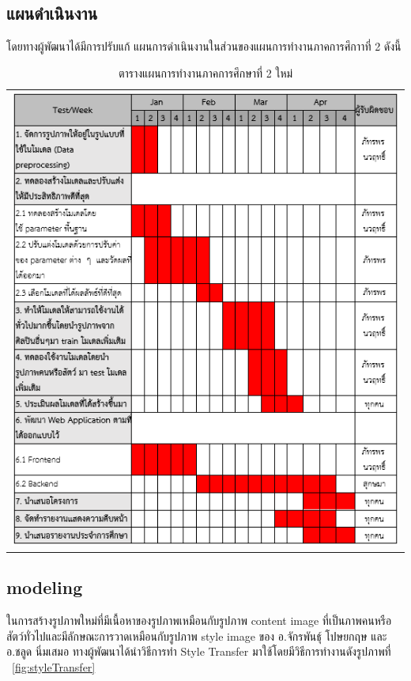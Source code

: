 \documentclass[12pt,oneside,openright,a4paper]{cpe-thai-project}
\begin{document}
\subsection{แผนดำเนินงาน}
โดยทางผู้พัฒนาได้มีการปรับแก้ แผนการดำเนินงานในส่วนของแผนการทำงานภาคการศึกาาที่ 2 ดังนี้

\begin{table}[!h]
  \centering
  \begin{tabular}{c}
  \hfill
  \includegraphics[width=15cm]{./image/newplan.png}
  \hfill
  \end{tabular}
\caption{ตารางแผนการทำงานภาคการศึกษาที่ 2 ใหม่\centering}
\label{tbl:newplan}
\end{table}

\newpage

\subsection{modeling}
\par\setlength{\parindent}{5ex}
ในการสร้างรูปภาพใหม่ที่มีเนื้อหาของรูปภาพเหมือนกับรูปภาพ content image ที่เป็นภาพคนหรือสัตว์ทั่วไปและมีลักษณะการวาดเหมือนกับรูปภาพ style image ของ อ.จักรพันธุ์ โปษยกฤษ และ อ.ชลูด นิ่มเสมอ ทางผู้พัฒนาได้นำวิธีการทำ Style Transfer มาใช้โดยมีวิธีการทำงานดังรูปภาพที่ ~\ref{fig:styleTransfer}
\end{document}
